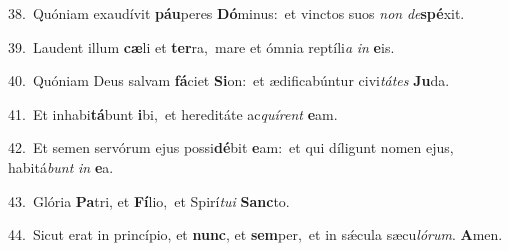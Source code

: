 {\numbfont\textcolor{\numbcolor}{38.}}~Quóniam exaudívit \textbf{páu}\-peres \textbf{Dó}\-minus:~\star et vinctos suos \textit{non} \textit{de}\-\textbf{spé}xit.\par
{\numbfont\textcolor{\numbcolor}{39.}}~Laudent illum \textbf{cæ}\-li et \textbf{ter}\-ra,~\star mare et ómnia reptíli\textit{a} \textit{in} \textbf{e}\-is.\par
{\numbfont\textcolor{\numbcolor}{40.}}~Quóniam Deus salvam \textbf{fá}\-ciet \textbf{Si}\-on:~\star et ædificabúntur civi\-\textit{tá}\-\textit{tes} \textbf{Ju}\-da.\par
{\numbfont\textcolor{\numbcolor}{41.}}~Et inhabi\-\textbf{tá}\-bunt \textbf{i}\-bi,~\star et hereditáte ac\-\textit{quí}\-\textit{rent} \textbf{e}\-am.\par
{\numbfont\textcolor{\numbcolor}{42.}}~Et semen servórum ejus possi\-\textbf{dé}\-bit \textbf{e}\-am:~\star et qui díligunt nomen ejus, habitá\textit{bunt} \textit{in} \textbf{e}\-a.\par
{\numbfont\textcolor{\numbcolor}{43.}}~Glória \textbf{Pa}\-tri, et \textbf{Fí}\-lio,~\star et Spirí\-\textit{tu}\-\textit{i} \textbf{Sanc}\-to.\par
{\numbfont\textcolor{\numbcolor}{44.}}~Sicut erat in princípio, et \textbf{nunc}\-, et \textbf{sem}\-per,~\star et in sǽcula sæcu\-\textit{ló}\-\textit{rum}. \textbf{A}\-men.\par
